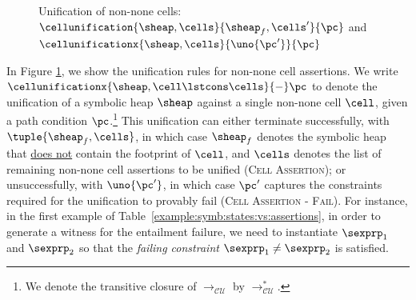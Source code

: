 \begin{figure}[!t]
{\scriptsize
{}}
\vspace*{-0.5cm}
\caption{Unification of non-none cells: $\cellunification{\sheap, \cells}{\sheap_f, \cells'}{\pc}$
and $\cellunificationx{\sheap, \cells}{\uno{\pc'}}{\pc}$}
\label{fig:uninonnone}
\vspace*{-0.2cm}
\end{figure}


In Figure \ref{fig:uninonnone}, we show the unification rules for non-none cell assertions. 
We write $\cellunificationx{\sheap, \cell \lstcons \cells}{-}\pc$ to denote the unification of a symbolic heap $\sheap$ against a single non-none cell $\cell$, given a path condition $\pc$.\footnote{We denote the transitive closure of $\rightarrow_{\mathcal{CU}}$ by $\rightarrow_{\mathcal{CU}}^*$.}  This unification can either terminate
successfully, with $\tuple{\sheap_f, \cells}$, in which case $\sheap_f$ denotes the
symbolic heap %
that \underline{does not} contain the footprint of $\cell$, 
 and $\cells$ denotes the list of remaining non-none cell assertions to be unified (\textsc{Cell Assertion}); or unsuccessfully, with $\uno{\pc'}$, 
in which case $\pc'$ captures the constraints required for the unification to provably fail (\textsc{Cell Assertion - Fail}).
For instance, in the first example of Table~\ref{example:symb:states:vs:assertions}, 
in order to generate a witness for the entailment failure, we need to instantiate $\sexprp_1$ and $\sexprp_2$ so that the \emph{failing constraint} $\sexprp_1 \neq \sexprp_2$ is satisfied. 


